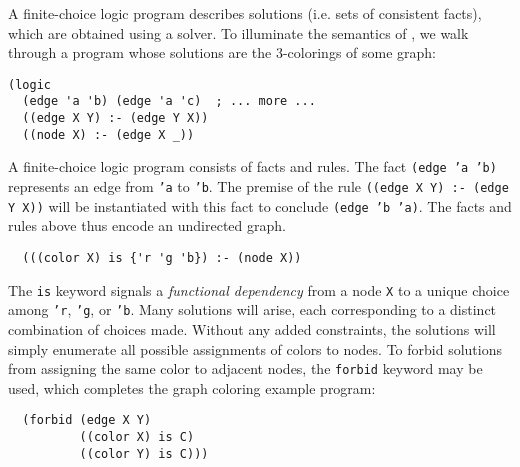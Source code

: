 \documentclass[dvipsnames,sigplan,screen,review,anonymous,acmthm,nonacm]{acmart}
\begin{document}
A finite-choice logic program describes solutions
(i.e. sets of consistent facts), which are obtained using a solver.
To illuminate the semantics of \miniDusa{}, we walk through
a program whose solutions are the 3-colorings of some graph:

\begin{verbatim}
(logic
  (edge 'a 'b) (edge 'a 'c)  ; ... more ...
  ((edge X Y) :- (edge Y X))
  ((node X) :- (edge X _))
\end{verbatim}

A finite-choice logic program consists of facts and rules.
The fact \texttt{(edge 'a 'b)} represents an edge from \texttt{'a} to \texttt{'b}.
The premise of the rule \texttt{((edge X Y) :- (edge Y X))} will be
instantiated with this fact to conclude \texttt{(edge 'b 'a)}.
The facts and rules above thus encode an undirected graph.

\begin{verbatim}
  (((color X) is {'r 'g 'b}) :- (node X))
\end{verbatim}

The \texttt{is} keyword signals a \emph{functional dependency}
from a node \texttt{X} to a unique choice among
\texttt{'r}, \texttt{'g}, or \texttt{'b}. Many solutions will arise,
each corresponding to a distinct combination of choices made.
Without any added constraints, the solutions will simply enumerate all
possible assignments of colors to nodes. To forbid solutions from
assigning the same color to adjacent nodes, 
the \texttt{forbid} keyword may be used, which
completes the graph coloring example program:

\begin{verbatim}
  (forbid (edge X Y)
          ((color X) is C)
          ((color Y) is C)))
\end{verbatim}
\end{document}
